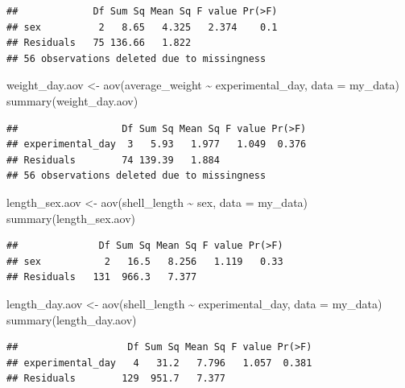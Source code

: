 \documentclass[
]{article}
\newenvironment{Shaded}{\begin{snugshade}}{\end{snugshade}}
\newcommand{\AttributeTok}[1]{\textcolor[rgb]{0.77,0.63,0.00}{#1}}
\newcommand{\FunctionTok}[1]{\textcolor[rgb]{0.00,0.00,0.00}{#1}}
\newcommand{\NormalTok}[1]{#1}
\newcommand{\OtherTok}[1]{\textcolor[rgb]{0.56,0.35,0.01}{#1}}
\newcommand{\SpecialCharTok}[1]{\textcolor[rgb]{0.00,0.00,0.00}{#1}}
\begin{document}
\begin{verbatim}
##             Df Sum Sq Mean Sq F value Pr(>F)
## sex          2   8.65   4.325   2.374    0.1
## Residuals   75 136.66   1.822               
## 56 observations deleted due to missingness
\end{verbatim}

\begin{Shaded}
\begin{Highlighting}[]
\NormalTok{weight\_day.aov }\OtherTok{\textless{}{-}} \FunctionTok{aov}\NormalTok{(average\_weight }\SpecialCharTok{\textasciitilde{}}\NormalTok{ experimental\_day, }\AttributeTok{data =}\NormalTok{ my\_data)}
\FunctionTok{summary}\NormalTok{(weight\_day.aov)}
\end{Highlighting}
\end{Shaded}

\begin{verbatim}
##                  Df Sum Sq Mean Sq F value Pr(>F)
## experimental_day  3   5.93   1.977   1.049  0.376
## Residuals        74 139.39   1.884               
## 56 observations deleted due to missingness
\end{verbatim}

\begin{Shaded}
\begin{Highlighting}[]
\NormalTok{length\_sex.aov }\OtherTok{\textless{}{-}} \FunctionTok{aov}\NormalTok{(shell\_length }\SpecialCharTok{\textasciitilde{}}\NormalTok{ sex, }\AttributeTok{data =}\NormalTok{ my\_data)}
\FunctionTok{summary}\NormalTok{(length\_sex.aov)}
\end{Highlighting}
\end{Shaded}

\begin{verbatim}
##              Df Sum Sq Mean Sq F value Pr(>F)
## sex           2   16.5   8.256   1.119   0.33
## Residuals   131  966.3   7.377
\end{verbatim}

\begin{Shaded}
\begin{Highlighting}[]
\NormalTok{length\_day.aov }\OtherTok{\textless{}{-}} \FunctionTok{aov}\NormalTok{(shell\_length }\SpecialCharTok{\textasciitilde{}}\NormalTok{ experimental\_day, }\AttributeTok{data =}\NormalTok{ my\_data)}
\FunctionTok{summary}\NormalTok{(length\_day.aov)}
\end{Highlighting}
\end{Shaded}

\begin{verbatim}
##                   Df Sum Sq Mean Sq F value Pr(>F)
## experimental_day   4   31.2   7.796   1.057  0.381
## Residuals        129  951.7   7.377
\end{verbatim}
\end{document}
